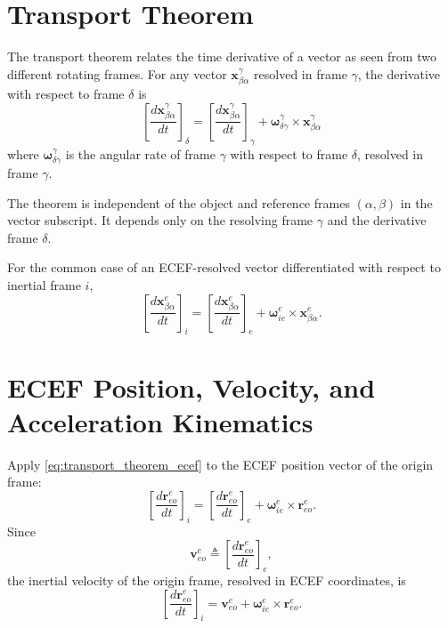 \documentclass[11pt,oneside]{book}
\begin{document}
\section{Transport Theorem}

The transport theorem relates the time derivative of a vector as seen from two different rotating frames. For any vector $\mathbf{x}_{\beta\alpha}^{\gamma}$ resolved in frame $\gamma$, the derivative with respect to frame $\delta$ is
\begin{equation}
\boxed{
\left[
\frac{d\mathbf{x}_{\beta\alpha}^{\gamma}}{dt}
\right]_{\delta}
=
\left[
\frac{d\mathbf{x}_{\beta\alpha}^{\gamma}}{dt}
\right]_{\gamma}
+
\boldsymbol{\omega}_{\delta\gamma}^{\gamma}
\times
\mathbf{x}_{\beta\alpha}^{\gamma}
}
\label{eq:transport_theorem_general}
\end{equation}
where $\boldsymbol{\omega}_{\delta\gamma}^{\gamma}$ is the angular rate of frame $\gamma$ with respect to frame $\delta$, resolved in frame $\gamma$.

The theorem is independent of the object and reference frames $(\alpha,\beta)$ in the vector subscript. It depends only on the resolving frame $\gamma$ and the derivative frame $\delta$.

For the common case of an ECEF-resolved vector differentiated with respect to inertial frame $i$,
\begin{equation}
\left[
\frac{d\mathbf{x}_{\beta\alpha}^{e}}{dt}
\right]_i
=
\left[
\frac{d\mathbf{x}_{\beta\alpha}^{e}}{dt}
\right]_e
+
\boldsymbol{\omega}_{ie}^{e}
\times
\mathbf{x}_{\beta\alpha}^{e}.
\label{eq:transport_theorem_ecef}
\end{equation}

\section{ECEF Position, Velocity, and Acceleration Kinematics}

Apply \cref{eq:transport_theorem_ecef} to the ECEF position vector of the origin frame:
\begin{equation}
\left[
\frac{d\mathbf{r}_{eo}^{e}}{dt}
\right]_{i}
=
\left[
\frac{d\mathbf{r}_{eo}^{e}}{dt}
\right]_{e}
+
\boldsymbol{\omega}_{ie}^{e}
\times
\mathbf{r}_{eo}^{e}.
\end{equation}
Since
\begin{equation}
\mathbf{v}_{eo}^{e}
\triangleq
\left[
\frac{d\mathbf{r}_{eo}^{e}}{dt}
\right]_{e},
\end{equation}
the inertial velocity of the origin frame, resolved in ECEF coordinates, is
\begin{equation}
\left[
\frac{d\mathbf{r}_{eo}^{e}}{dt}
\right]_{i}
=
\mathbf{v}_{eo}^{e}
+
\boldsymbol{\omega}_{ie}^{e}
\times
\mathbf{r}_{eo}^{e}.
\label{eq:inertial_velocity_from_ecef_velocity}
\end{equation}
\end{document}
